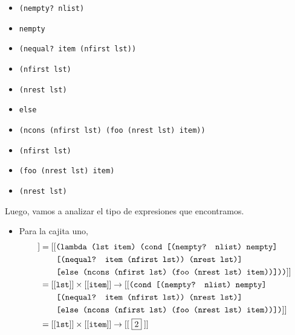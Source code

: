 \documentclass[letterpaper,11pt]{article}
\begin{document}
\begin{enumerate}
\begin{itemize}
        \item {} \texttt{(nempty? nlist)}

        \item {} \texttt{nempty}
        
        \item {} \texttt{(nequal? item (nfirst lst))}

        \item {} \texttt{(nfirst lst)}
        
        \item {} \texttt{(nrest lst)}
        
        \item {} \texttt{else}
        
        \item {} \texttt{(ncons (nfirst lst) (foo (nrest lst) item))}

        \item {} \texttt{(nfirst lst)}

        \item {} \texttt{(foo (nrest lst) item)}

        \item {} \texttt{(nrest lst)}
    \end{itemize}

    Luego, vamos a analizar el tipo de expresiones que encontramos.
    \begin{itemize}
        \item Para la cajita uno,
        \begin{align*}
            [[\;\fbox{1}\;]]
            &= [[\texttt{(lambda (lst item) (cond [(nempty? nlist) nempty]} \\ 
            &\; \; \; \; \; \; \; \texttt{[(nequal? item (nfirst lst)) 
            (nrest lst)]} \\
            &\; \; \; \; \; \; \; \texttt{[else (ncons (nfirst lst) 
            (foo (nrest lst) item))]))}]] \\ 
            &= [[\texttt{lst}]] \times [[\texttt{item}]] \rightarrow 
            [[\texttt{(cond [(nempty? nlist) nempty]} \\ 
            &\; \; \; \; \; \; \; \texttt{[(nequal? item (nfirst lst)) 
            (nrest lst)]} \\
            &\; \; \; \; \; \; \; \texttt{[else (ncons (nfirst lst) 
            (foo (nrest lst) item))])}]] \\ 
            &= [[\texttt{lst}]] \times [[\texttt{item}]] \rightarrow [[\;\fbox{2}\;]]
        \end{align*}
   

\end{itemize}
\end{enumerate}
\end{document}
